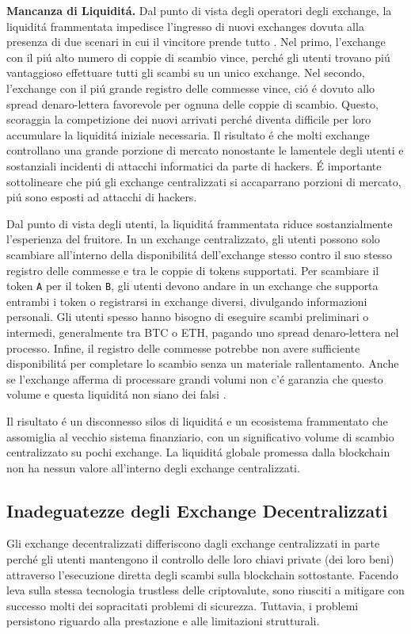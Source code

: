 \documentclass[UTF8,nofonts]{article}
\begin{document}
\begin{multicols}{2}
\textbf{Mancanza di Liquidit\'a.} Dal punto di vista degli operatori degli exchange, la liquidit\'a frammentata impedisce l'ingresso di nuovi exchanges dovuta alla presenza di due scenari in cui il vincitore prende tutto . Nel primo, l'exchange con il pi\'u alto numero di coppie di scambio vince, perch\'e gli utenti trovano pi\'u vantaggioso effettuare tutti gli scambi su un unico exchange. Nel secondo, l'exchange con il pi\'u grande registro delle commesse vince, ci\'o \'e dovuto allo spread denaro-lettera favorevole per ognuna delle coppie di scambio. Questo, scoraggia la competizione dei nuovi arrivati perch\'e diventa difficile per loro accumulare la liquidit\'a iniziale necessaria. Il risultato \'e che molti exchange controllano una grande porzione di mercato nonostante le lamentele degli utenti e sostanziali incidenti di attacchi informatici da parte di hackers. \'E importante sottolineare che pi\'u gli exchange centralizzati si accaparrano porzioni di mercato, pi\'u sono esposti ad attacchi di hackers.

Dal punto di vista degli utenti, la liquidit\'a frammentata riduce sostanzialmente l'esperienza del fruitore. In un exchange centralizzato, gli utenti possono solo scambiare all'interno della disponibilit\'a dell'exchange stesso contro il suo stesso registro delle commesse e tra le coppie di tokens supportati. Per scambiare il token \verb|A| per il token \verb|B|, gli utenti devono andare in un exchange che supporta entrambi i token o registrarsi in exchange diversi, divulgando informazioni personali. Gli utenti spesso hanno bisogno di eseguire scambi preliminari o intermedi, generalmente tra BTC o ETH, pagando uno spread denaro-lettera nel processo. Infine, il registro delle commesse potrebbe non avere sufficiente disponibilit\'a per completare lo scambio senza un materiale rallentamento. Anche se l'exchange afferma di processare grandi volumi non c'\'e garanzia che questo volume e questa liquidit\'a non siano dei falsi \cite{fakevolume}.

Il risultato \'e un disconnesso silos di liquidit\'a e un ecosistema frammentato che assomiglia al vecchio sistema finanziario, con un significativo volume di scambio centralizzato su pochi exchange. La liquidit\'a globale promessa dalla blockchain non ha nessun valore all'interno degli exchange centralizzati.

\subsection{Inadeguatezze degli Exchange Decentralizzati}
Gli exchange decentralizzati differiscono dagli exchange centralizzati in parte perch\'e gli utenti mantengono il controllo delle loro chiavi private (dei loro beni) attraverso l'esecuzione diretta degli scambi sulla blockchain sottostante. Facendo leva sulla stessa tecnologia trustless delle criptovalute, sono riusciti a  mitigare con successo molti dei sopracitati problemi di sicurezza. Tuttavia, i problemi persistono riguardo alla prestazione e alle limitazioni strutturali.


\end{multicols}
\end{document}
